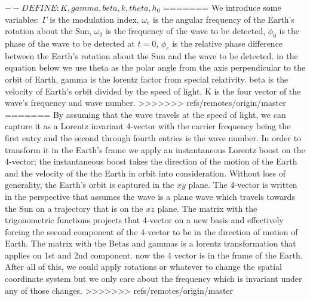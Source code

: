 \documentclass[onecolumn, groupedaddress, 10pt]{revtex4-1}
\begin{document}
$-- DEFINE : K, gamma, beta, k, theta, h_0$
=======
We introduce some variables: $\Gamma$ is the modulation index, $\omega_e$ is the angular frequency of the Earth's rotation about the Sun, $\omega_0$ is the frequency of the wave to be detected, $\phi_0$ is the phase of the wave to be detected at $t=0$, $\phi_e$ is the relative phase difference between the Earth's rotation about the Sun and the wave to be detected. in the equation below we use theta as the polar angle from the axis perpendicular to the orbit of Earth, gamma is the lorentz factor from special relativity. beta is the velocity of Earth's orbit divided by the speed of light. K is the four vector of the wave's frequency and wave number.
>>>>>>> refs/remotes/origin/master
=======
By assuming that the wave travels at the speed of light, we can capture it as a Lorentz invariant 4-vector with the carrier frequency being the first entry and the second through fourth entries is the wave number. In order to transform it in the Earth's frame we apply an instantaneous Lorentz boost on the 4-vector; the instantaneous boost takes the direction of the motion of the Earth and the velocity of the the Earth in orbit into consideration. Without loss of generality, the Earth's orbit is captured in the $xy$ plane. The 4-vector is written in the perspective that assumes the wave is a plane wave which travels towards the Sun on a trajectory that is on the $xz$ plane. The matrix with the trigonometric functions projects that 4-vector on a new basis and effectively forcing the second component of the 4-vector to be in the direction of motion of Earth. The matrix with the Betas and gammas is a lorentz transformation that applies on 1st and 2nd component. now the 4 vector is in the frame of the Earth. After all of this, we could apply rotations or whatever to change the spatial coordinate system but we only care about the frequency which is invariant under any of those changes.
>>>>>>> refs/remotes/origin/master
\end{document}
